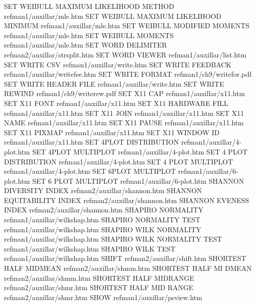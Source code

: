 SET WEIBULL MAXIMUM LIKELIHOOD METHOD   refman1/auxillar/mle.htm
SET WEIBULL MAXIMUM LIKELIHOOD MINIMUM  refman1/auxillar/mle.htm
SET WEIBULL MODIFIED MOMENTS            refman1/auxillar/mle.htm
SET WEIBULL MOMENTS                     refman1/auxillar/mle.htm
SET WORD DELIMITER                      refman2/auxillar/strsplit.htm
SET WORD VIEWER                         refman1/auxillar/list.htm
SET WRITE CSV                           refman1/auxillar/write.htm
SET WRITE FEEDBACK                      refman1/auxillar/writefee.htm
SET WRITE FORMAT                        refman1/ch9/writefor.pdf
SET WRITE HEADER FILE                   refman1/auxillar/write.htm
SET WRITE REWIND                        refman1/ch9/writerew.pdf
SET X11 CAP                             refman1/auxillar/x11.htm
SET X11 FONT                            refman1/auxillar/x11.htm
SET X11 HARDWARE FILL                   refman1/auxillar/x11.htm
SET X11 JOIN                            refman1/auxillar/x11.htm
SET X11 NAME                            refman1/auxillar/x11.htm
SET X11 PAUSE                           refman1/auxillar/x11.htm
SET X11 PIXMAP                          refman1/auxillar/x11.htm
SET X11 WINDOW ID                       refman1/auxillar/x11.htm
SET 4PLOT DISTRIBUTION                  refman1/auxillar/4-plot.htm
SET 4PLOT MULTIPLOT                     refman1/auxillar/4-plot.htm
SET 4 PLOT DISTRIBUTION                 refman1/auxillar/4-plot.htm
SET 4 PLOT MULTIPLOT                    refman1/auxillar/4-plot.htm
SET 6PLOT MULTIPLOT                     refman1/auxillar/6-plot.htm
SET 6 PLOT MULTIPLOT                    refman1/auxillar/6-plot.htm
SHANNON DIVERSITY INDEX                 refman2/auxillar/shannon.htm
SHANNON EQUITABILITY INDEX              refman2/auxillar/shannon.htm
SHANNON EVENESS INDEX                   refman2/auxillar/shannon.htm
SHAPIRO NORMALITY                       refman1/auxillar/wilkshap.htm
SHAPIRO NORMALITY TEST                  refman1/auxillar/wilkshap.htm
SHAPIRO WILK NORMALITY                  refman1/auxillar/wilkshap.htm
SHAPIRO WILK NORMALITY TEST             refman1/auxillar/wilkshap.htm
SHAPIRO WILK TEST                       refman1/auxillar/wilkshap.htm
SHIFT                                   refman2/auxillar/shift.htm
SHORTEST HALF MIDMEAN                   refman2/auxillar/shmm.htm
SHORTEST HALF MI DMEAN                  refman2/auxillar/shmm.htm
SHORTEST HALF MIDRANGE                  refman2/auxillar/shmr.htm
SHORTEST HALF MID RANGE                 refman2/auxillar/shmr.htm
SHOW                                    refman1/auxillar/psview.htm
